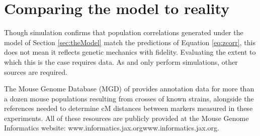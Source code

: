 \documentclass{article}
\newcommand{\href}[1]{#1} %
\newcommand{\code}[1]{\texttt{#1}}
\newcommand{\ve}[1]{\mathbf{#1}}           %
\begin{document}



\section{Comparing the model to reality} \label{sec:model2real}

Though simulation confirms that population correlations generated under the model of Section \ref{sec:theModel} match the predictions of Equation \ref{eq:zcorr}, this does not mean it reflects genetic mechanics with fidelity. Evaluating the extent to which this is the case requires data. As \cite{LanderBotstein1989} and \cite{cheverud2001} only perform simulations, other sources are required.

The Mouse Genome Database (MGD) of \cite{bultetal2019mouse} provides annotation data for more than a dozen mouse populations resulting from crosses of known strains, alongside the references needed to determine cM distances between markers measured in these experiments. All of these resources are publicly provided at the Mouse Genome Informatics website: \href{www.informatics.jax.org}{www.informatics.jax.org}.
\end{document}
